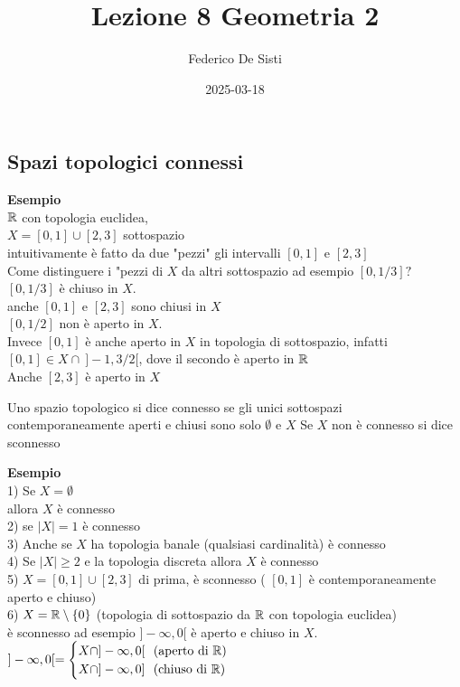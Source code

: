 \documentclass[12px]{article}
\title{Lezione 8 Geometria 2}
\date{2025-03-18}
\author{Federico De Sisti}
\begin{document}
	\maketitle
	\newpage
	\subsection{Spazi topologici connessi}
	\textbf{Esempio}\\
	$\mathbb{R}$ con topologia euclidea,\\
	$X = [0,1]\cup [2,3]$ sottospazio\\
	intuitivamente è fatto da due "pezzi" gli intervalli $[0,1]$ e $[2,3]$\\
	Come distinguere i "pezzi  di  $X$ da altri sottospazio ad esempio $[0,1/3]?$\\
	$[0,1/3]$ è chiuso in $X$.\\
	anche  $[0,1]$ e $[2,3]$ sono chiusi in $X$\\
	$[0,1/2]$ non è aperto in $X$.\\
	Invece $[0,1]$ è anche aperto in $X$ in topologia di sottospazio, infatti $[0,1]\in X \cap \ ]-1,3/2[$, dove il secondo è aperto in  $\mathbb{R}$\\
	Anche $[2,3]$ è aperto in  $X$ \\
	\begin{defi}
		Uno spazio topologico si dice connesso se gli unici sottospazi contemporaneamente aperti e chiusi sono solo $\emptyset $ e $X$ Se  $X$ non è connesso si dice sconnesso
	\end{defi}
	\textbf{Esempio}\\
	1) Se $X = \emptyset$\\
 allora $X$ è connesso\\
 2) se $|X| = 1$ è connesso \\
 3) Anche se $X$ ha topologia banale (qualsiasi cardinalità) è connesso\\
 4) Se  $|X|\geq 2$ e la topologia discreta allora  $X$ è connesso\\
 5)  $X = [0,1]\cup [2,3]$ di prima, è sconnesso ( $[0,1]$ è contemporaneamente aperto e chiuso)\\
 6) $X = \mathbb{R}\setminus\{0\}$ (topologia di sottospazio da  $\mathbb{R}$ con topologia euclidea)\\
 è sconnesso ad esempio $]-\infty, 0[$ è aperto e chiuso in  $X$.\\
 $]-\infty, 0[ = \begin{cases}
	 X\cap ]-\infty, 0[ \ \text{ (aperto di $\mathbb{R}$)}\\
	 X\cap ]-\infty, 0] \ \text{ (chiuso di $\mathbb{R}$)}
 \end{cases}$ \\
\end{document}
